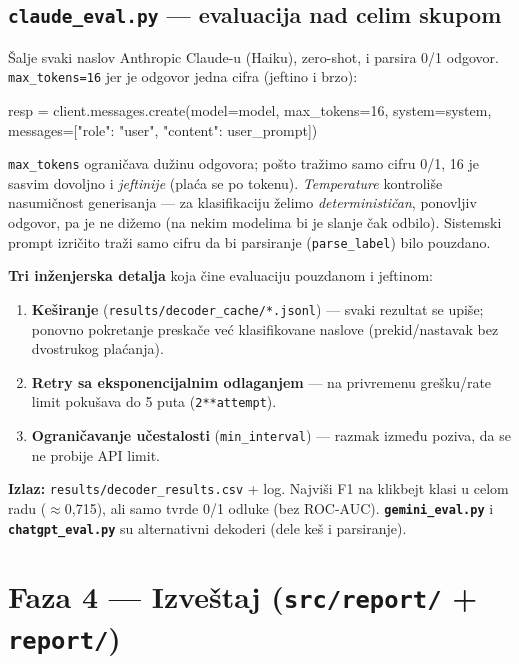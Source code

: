 \documentclass[11pt,a4paper]{article}
\newcommand{\fajl}[1]{\textbf{\texttt{#1}}}
\newcommand{\kod}[1]{\texttt{#1}}
\begin{document}
\subsection{\texttt{claude\_eval.py} --- evaluacija nad celim skupom}
Šalje svaki naslov Anthropic Claude-u (Haiku), zero-shot, i parsira 0/1 odgovor.
\kod{max\_tokens=16} jer je odgovor jedna cifra (jeftino i brzo):
\begin{code}
resp = client.messages.create(model=model, max_tokens=16,
        system=system, messages=[{"role": "user", "content": user_prompt}])
\end{code}
\begin{teorija}[ --- zašto \kod{max\_tokens=16} i bez \emph{temperature}]
\kod{max\_tokens} ograničava dužinu odgovora; pošto tražimo samo cifru 0/1, 16 je
sasvim dovoljno i \emph{jeftinije} (plaća se po tokenu). \emph{Temperature} kontroliše
nasumičnost generisanja --- za klasifikaciju želimo \emph{determinističan}, ponovljiv
odgovor, pa je ne dižemo (na nekim modelima bi je slanje čak odbilo). Sistemski prompt
izričito traži samo cifru da bi parsiranje (\kod{parse\_label}) bilo pouzdano.
\end{teorija}

\textbf{Tri inženjerska detalja} koja čine evaluaciju pouzdanom i jeftinom:
\begin{enumerate}[nosep]
  \item \textbf{Keširanje} (\kod{results/decoder\_cache/*.jsonl}) --- svaki rezultat se
    upiše; ponovno pokretanje preskače već klasifikovane naslove (prekid/nastavak bez
    dvostrukog plaćanja).
  \item \textbf{Retry sa eksponencijalnim odlaganjem} --- na privremenu grešku/rate
    limit pokušava do 5 puta (\kod{2**attempt}).
  \item \textbf{Ograničavanje učestalosti} (\kod{min\_interval}) --- razmak između
    poziva, da se ne probije API limit.
\end{enumerate}

\textbf{Izlaz:} \kod{results/decoder\_results.csv} + log. Najviši F1 na klikbejt klasi
u celom radu ($\approx$0,715), ali samo tvrde 0/1 odluke (bez ROC-AUC).
\fajl{gemini\_eval.py} i \fajl{chatgpt\_eval.py} su alternativni dekoderi (dele keš i
parsiranje).

\section{Faza 4 --- Izveštaj (\texttt{src/report/} + \texttt{report/})}
\end{document}
